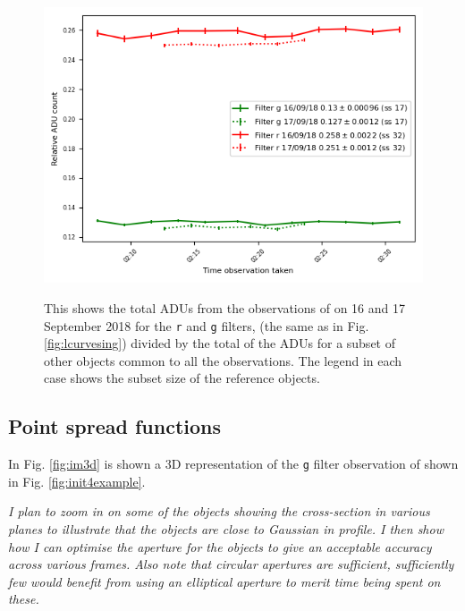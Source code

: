 \begin{figure}[!htbp]
\begin{center}
\includegraphics[scale=1]{images/demo_lcurve_refs.png}
\end{center}
\caption{This shows the total ADUs from the observations of {\prox} on 16 and
17 September 2018 for the \texttt{r} and \texttt{g} filters, (the same as in
Fig. \ref{fig:lcurvesing}) divided by the total of the ADUs for a subset of
other objects common to all the observations. The legend in each case shows the
subset size of the reference objects. }
\protect\label{fig:lcurveref}
\end{figure}

\clearpage

\subsection{Point spread functions}
\protect\label{section:pointspreadfunc}

In Fig. \ref{fig:im3d} is shown a 3D representation of the \texttt{g} filter
observation of {\prox} shown in Fig. \ref{fig:init4example}.

\textit{I plan to zoom in on some of the objects showing the cross-section in
various planes to illustrate that the objects are close to Gaussian in profile.
I then show how I can optimise the aperture for the objects to give an
acceptable accuracy across various frames. Also note that circular apertures
are sufficient, sufficiently few would benefit from using an elliptical
aperture to merit time being spent on these.}

